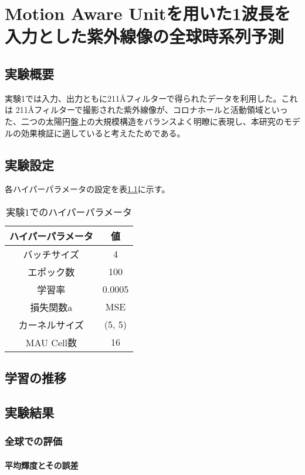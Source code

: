 \chapter{Motion Aware Unitを用いた1波長を入力とした紫外線像の全球時系列予測}
  \section{実験概要}
  実験1では入力、出力ともに211Åフィルターで得られたデータを利用した。これは 211Åフィルターで撮影された紫外線像が、コロナホールと活動領域といった、二つの太陽円盤上の大規模構造をバランスよく明瞭に表現し、本研究のモデルの効果検証に適していると考えたためである。
  \section{実験設定}
    各ハイパーパラメータの設定を表\ref{tab:hyperparameters1}に示す。
    \begin{table}[h]
      \centering
      \begin{tabular}{|c|c|}
      \hline
      ハイパーパラメータ & 値 \\
      \hline\hline
      バッチサイズ & 4 \\
      \hline
      エポック数 & 100 \\
      \hline
      学習率 & 0.0005 \\
      \hline
      損失関数a & MSE \\
      \hline
      カーネルサイズ & (5, 5) \\
      \hline
      MAU Cell数 & 16 \\
      \hline
      \end{tabular}
      \caption{実験1でのハイパーパラメータ}
      \label{tab:hyperparameters1}
    \end{table}


  \section{学習の推移}
  \section{実験結果}
    \subsection{全球での評価}
      \subsubsection{平均輝度とその誤差}
